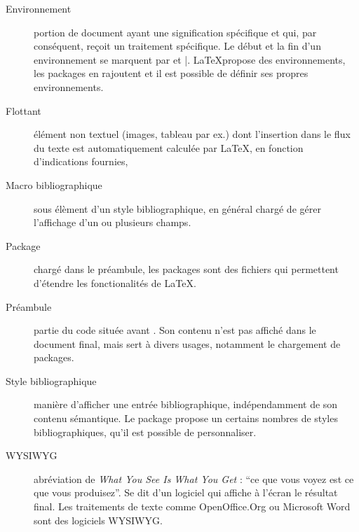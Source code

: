 \begin{description}
\item[Environnement] portion de document ayant une signification spécifique et qui, par conséquent, reçoit un traitement spécifique. Le début et la fin d'un environnement se marquent par  et |. \LaTeX propose des environnements, les packages en rajoutent et il est possible de définir ses propres environnements.

\item[Flottant] élément non textuel (images, tableau par ex.) dont l'insertion dans le flux du texte est automatiquement calculée par \LaTeX, en fonction d'indications fournies, 

\item[Macro bibliographique] sous élèment d'un style bibliographique, en général chargé de gérer l'affichage d'un ou plusieurs champs.

\item[Package] chargé dans le préambule, les packages sont des fichiers qui permettent d'étendre les fonctionalités  de \LaTeX.

\item[Préambule] partie du code  située avant . Son contenu n'est pas affiché dans le document final, mais sert à divers usages, notamment le chargement de packages.

\item[Style bibliographique] manière d'afficher une entrée bibliographique, indépendamment de son contenu sémantique. Le package  propose un certains nombres de styles bibliographiques, qu'il est possible de personnaliser. 

\item[WYSIWYG] abréviation de \textenglish{\emph{What You See Is What You Get}} : \enquote{ce que vous voyez est ce que vous produisez}. Se dit d'un logiciel qui affiche à l'écran le résultat final. Les traitements de texte comme OpenOffice.Org ou Microsoft Word sont des logiciels WYSIWYG.
\end{description}
